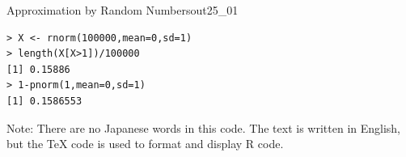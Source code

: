 \begin{Rscreen}{Approximation by Random Numbers}{out25_01}
	\begin{verbatim}
> X <- rnorm(100000,mean=0,sd=1)
> length(X[X>1])/100000
[1] 0.15886
> 1-pnorm(1,mean=0,sd=1)
[1] 0.1586553\end{verbatim}
\end{Rscreen}

Note: There are no Japanese words in this code. The text is written in English, but the TeX code is used to format and display R code.
